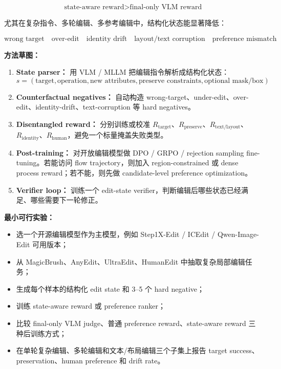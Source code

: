 \[
\text{state-aware reward}
>
\text{final-only VLM reward}
\]

尤其在复杂指令、多轮编辑、多参考编辑中，结构化状态能显著降低：

\[
\text{wrong target}
\quad
\text{over-edit}
\quad
\text{identity drift}
\quad
\text{layout/text corruption}
\quad
\text{preference mismatch}
\]

\textbf{方法草图：}

\begin{enumerate}[leftmargin=1.5em]
  \item \textbf{State parser：} 用 VLM / MLLM 把编辑指令解析成结构化状态：
  \[
  s=(\text{target},\text{operation},\text{new attributes},\text{preserve constraints},\text{optional mask/box})
  \]
  \item \textbf{Counterfactual negatives：} 自动构造 wrong-target、under-edit、over-edit、identity-drift、text-corruption 等 hard negatives。
  \item \textbf{Disentangled reward：} 分别训练或校准 $R_\text{target}$、$R_\text{preserve}$、$R_\text{text/layout}$、$R_\text{identity}$、$R_\text{human}$，避免一个标量掩盖失败类型。
  \item \textbf{Post-training：} 对开放编辑模型做 DPO / GRPO / rejection sampling fine-tuning。若能访问 flow trajectory，则加入 region-constrained 或 dense process reward；若不能，则先做 candidate-level preference optimization。
  \item \textbf{Verifier loop：} 训练一个 edit-state verifier，判断编辑后哪些状态已经满足、哪些需要下一轮修正。
\end{enumerate}

\textbf{最小可行实验：}

\begin{itemize}[leftmargin=1.5em]
  \item 选一个开源编辑模型作为主模型，例如 Step1X-Edit / ICEdit / Qwen-Image-Edit 可用版本；
  \item 从 MagicBrush、AnyEdit、UltraEdit、HumanEdit 中抽取复杂局部编辑任务；
  \item 生成每个样本的结构化 edit state 和 3--5 个 hard negative；
  \item 训练 state-aware reward 或 preference ranker；
  \item 比较 final-only VLM judge、普通 preference reward、state-aware reward 三种后训练方式；
  \item 在单轮复杂编辑、多轮编辑和文本/布局编辑三个子集上报告 target success、preservation、human preference 和 drift rate。
\end{itemize}

